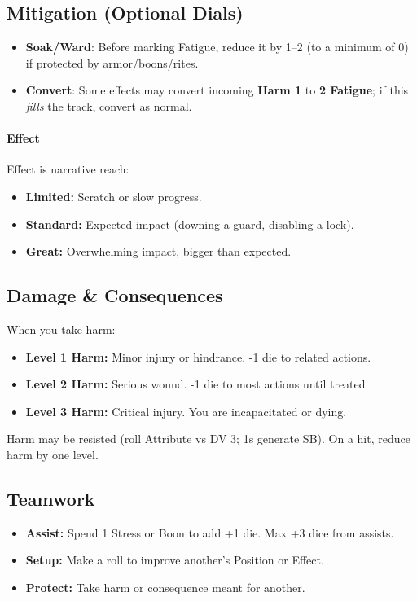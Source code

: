 \subsection*{Mitigation (Optional Dials)}
\begin{itemize}
  \item \textbf{Soak/Ward}: Before marking Fatigue, reduce it by 1--2 (to a minimum of 0) if protected by armor/boons/rites.
  \item \textbf{Convert}: Some effects may convert incoming \textbf{Harm 1} to \textbf{2 Fatigue}; if this \emph{fills} the track, convert as normal.
\end{itemize}

\paragraph{Effect}
Effect is narrative reach:
\begin{itemize}
  \item \textbf{Limited:} Scratch or slow progress.
  \item \textbf{Standard:} Expected impact (downing a guard, disabling a lock).
  \item \textbf{Great:} Overwhelming impact, bigger than expected.
\end{itemize}

\subsection{Damage \& Consequences}
When you take harm:
\begin{itemize}
  \item \textbf{Level 1 Harm:} Minor injury or hindrance. -1 die to related actions.
  \item \textbf{Level 2 Harm:} Serious wound. -1 die to most actions until treated.
  \item \textbf{Level 3 Harm:} Critical injury. You are incapacitated or dying.
\end{itemize}
Harm may be resisted (roll Attribute vs DV 3; 1s generate SB). On a hit, reduce harm by one level.

\subsection{Teamwork}
\begin{itemize}
  \item \textbf{Assist:} Spend 1 Stress or Boon to add +1 die. Max +3 dice from assists.
  \item \textbf{Setup:} Make a roll to improve another’s Position or Effect.
  \item \textbf{Protect:} Take harm or consequence meant for another.
\end{itemize}

